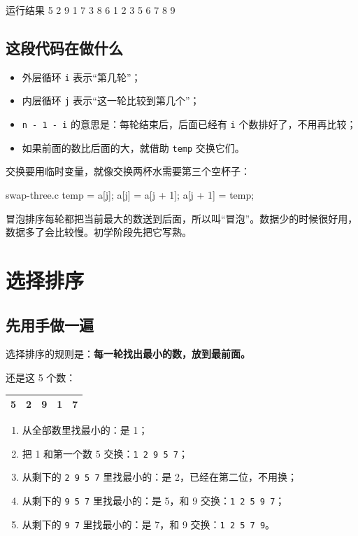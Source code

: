\begin{outbox}{运行结果}
5 2 9 1 7 3 8 6
1 2 3 5 6 7 8 9
\end{outbox}

\subsection{这段代码在做什么}

\begin{itemize}
  \item 外层循环 \texttt{i} 表示“第几轮”；
  \item 内层循环 \texttt{j} 表示“这一轮比较到第几个”；
  \item \texttt{n - 1 - i} 的意思是：每轮结束后，后面已经有 \texttt{i} 个数排好了，不用再比较；
  \item 如果前面的数比后面的大，就借助 \texttt{temp} 交换它们。
\end{itemize}

\begin{tipbox}[交换两个数]
交换要用临时变量，就像交换两杯水需要第三个空杯子：
\begin{codebox}{swap-three.c}
temp = a[j];
a[j] = a[j + 1];
a[j + 1] = temp;
\end{codebox}
\end{tipbox}

\begin{note}
冒泡排序每轮都把当前最大的数送到后面，所以叫“冒泡”。数据少的时候很好用，数据多了会比较慢。初学阶段先把它写熟。
\end{note}

\section{选择排序}

\subsection{先用手做一遍}

选择排序的规则是：\textbf{每一轮找出最小的数，放到最前面。}

还是这 5 个数：

\begin{center}
\begin{tabular}{@{}ccccc@{}}
\toprule
5 & 2 & 9 & 1 & 7 \\
\bottomrule
\end{tabular}
\end{center}

\begin{enumerate}
  \item 从全部数里找最小的：是 1；
  \item 把 1 和第一个数 5 交换：\texttt{1 2 9 5 7}；
  \item 从剩下的 \texttt{2 9 5 7} 里找最小的：是 2，已经在第二位，不用换；
  \item 从剩下的 \texttt{9 5 7} 里找最小的：是 5，和 9 交换：\texttt{1 2 5 9 7}；
  \item 从剩下的 \texttt{9 7} 里找最小的：是 7，和 9 交换：\texttt{1 2 5 7 9}。
\end{enumerate}

